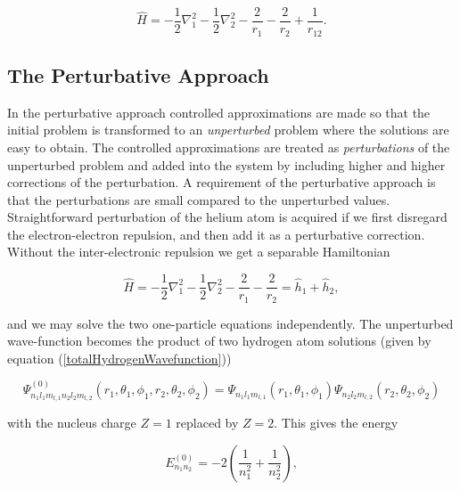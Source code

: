\begin{equation}
  \hat{H} = -\frac{1}{2} \nabla_1^2 - \frac{1}{2} \nabla_2^2  -
  \frac{2}{r_1} - \frac{2}{r_2} + \frac{1}{r_{12}}.
  \label{HeliumHamiltonian}
\end{equation}


\subsection{The Perturbative Approach}
In the perturbative approach controlled approximations are made so
that the initial problem is transformed to an \emph{unperturbed} problem
where the solutions are easy to obtain. The controlled approximations
are treated as \emph{perturbations} of the unperturbed problem and
added into the system by including higher and higher corrections of
the perturbation. A requirement of the perturbative approach is that
the perturbations are small compared to the unperturbed values.
Straightforward perturbation of the helium atom is acquired if we
first disregard the electron-electron repulsion, and then add it as a
perturbative correction. 
\newline
%
\newline
Without the inter-electronic 
repulsion we get a separable Hamiltonian

\begin{equation*}
  \hat{H} = -\frac{1}{2} \nabla_1^2 - \frac{1}{2} \nabla_2^2  -
  \frac{2}{r_1} - \frac{2}{r_2} = \hat{h}_1 + \hat{h}_2,
\end{equation*}

and we may solve the two one-particle equations independently. The
unperturbed wave-function becomes the product of two hydrogen atom
solutions (given by equation (\ref{totalHydrogenWavefunction}))


\begin{equation*}
  \Psi_{n_1 l_1 m_{l,1} n_2 l_2 m_{l,2}}^{(0)}
  (r_1, \theta_1, \phi_1, r_2, \theta_2, \phi_2)=
  \Psi_{n_1 l_1 m_{l,1}}(r_1, \theta_1, \phi_1)
  \Psi_{n_2 l_2 m_{l,2}}(r_2, \theta_2, \phi_2)
\end{equation*}

with the nucleus charge $Z=1$ replaced by $Z=2$. This gives the
energy

\begin{equation}
  E_{n_1n_2}^{(0)} = -2\left(\frac{1}{n_1^2}+\frac{1}{n_2^2}\right),
\label{unperturbedHeliumEnergy}
\end{equation}


